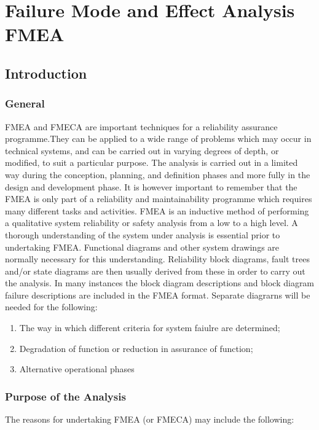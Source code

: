 \documentclass[./dissertation.tex]{subfiles}
\begin{document}
\chapter{Failure Mode and Effect Analysis FMEA}

\section{Introduction}
\subsection{General}
FMEA and FMECA are important techniques for a reliability assurance programme.They can be applied to a wide range of problems which may occur in technical systems, and can be carried out in varying degrees of depth, or modified, to suit a particular purpose. The analysis is carried out in a limited way during the conception, planning, and definition phases and more fully in the design and development phase. It is however important to remember that the FMEA is only part of a reliability and
maintainability programme which requires many different tasks and activities. FMEA is an inductive method of performing a qualitative system reliability or safety analysis from a low to a high level. A thorough understanding of the system under analysis is essential prior to undertaking FMEA. Functional diagrams and other system drawings are normally necessary for this understanding. Reliability block diagrams, fault trees and/or state diagrams are then usually derived from these in order to
carry out the analysis. In many instances the block diagram descriptions and block diagram failure descriptions are included in the FMEA format. Separate diagrarns will be needed for the
following:
\begin{enumerate}
    \item The way in which different criteria for system faiulre are determined;
    \item Degradation of function or reduction in assurance of function;
    \item Alternative operational phases
\end{enumerate}

\subsection{Purpose of the Analysis}
The reasons for undertaking FMEA (or FMECA) may include the following:
\end{document}
